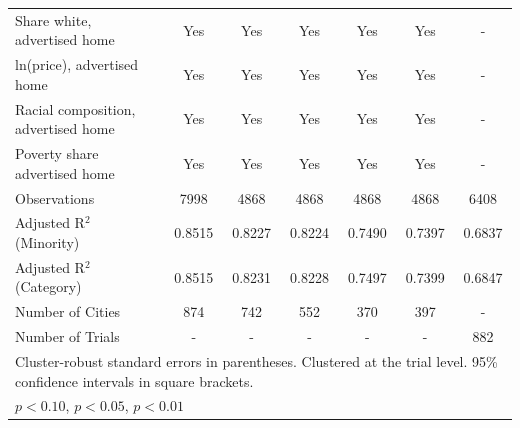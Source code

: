 \begin{table}[htbp]
{\begin{tabular}{l*{6}{c}}
\midrule
Share white, advertised home  & Yes & Yes & Yes & Yes & Yes & - \\
ln(price), advertised home  & Yes & Yes & Yes & Yes & Yes & - \\
Racial composition, advertised home & Yes & Yes & Yes & Yes & Yes & - \\
Poverty share advertised home & Yes & Yes & Yes & Yes & Yes & - \\
Observations & 7998 & 4868 & 4868 & 4868 & 4868 & 6408 \\
Adjusted R$^2$ (Minority) & 0.8515 & 0.8227 & 0.8224 & 0.7490 & 0.7397 & 0.6837 \\
Adjusted R$^2$ (Category) & 0.8515 & 0.8231 & 0.8228 & 0.7497 & 0.7399 & 0.6847 \\
Number of Cities & 874 & 742 & 552 & 370 & 397 & - \\
Number of Trials & - & - & - & - & - & 882 \\
\bottomrule
\multicolumn{7}{l}{\footnotesize Cluster-robust standard errors in parentheses. Clustered at the trial level. 95\% confidence intervals in square brackets.}\\
\multicolumn{7}{l}{\footnotesize \sym{*} \(p<0.10\), \sym{**} \(p<0.05\), \sym{***} \(p<0.01\)}\\
\end{tabular}
}
\end{table}
